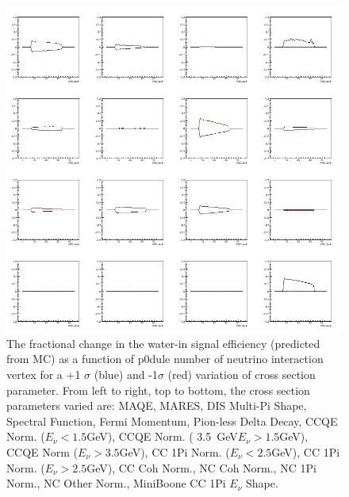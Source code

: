 \newpage
\clearpage
\begin{figure}[h]
\centering
\includegraphics[width=5in]{Figures/TN100Plots/c_6_0.png}
\caption{The fractional change in the water-in signal efficiency (predicted from MC) as a function of p0dule number of neutrino interaction vertex for a +1 $\sigma$ (blue) and -1$\sigma$ (red) variation of cross section parameter. From left to right, top to bottom, the cross section parameters varied are: MAQE, MARES, DIS Multi-Pi Shape, Spectral Function, Fermi Momentum, Pion-less Delta Decay, CCQE Norm. ($E_\nu < 1.5$GeV), CCQE Norm. ( 3.5~GeV$E_\nu>1.5$GeV), CCQE Norm ($E_\nu > 3.5$GeV), CC 1Pi Norm. ($E_\nu < 2.5$GeV), CC 1Pi Norm. ($E_\nu > 2.5$GeV), CC Coh Norm., NC Coh Norm., NC 1Pi Norm., NC Other Norm., MiniBoone CC 1Pi $E_\nu$ Shape.}
\label{fig:xsvar1}
\end{figure}

